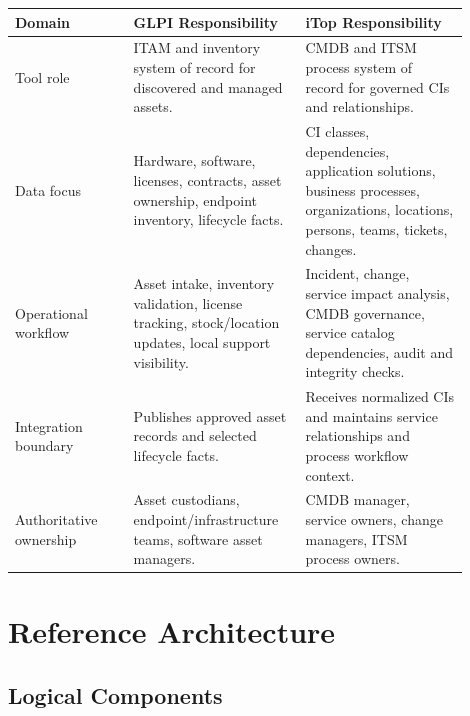 \documentclass[11pt]{article}
\begin{document}
\begin{longtable}{p{0.24\linewidth}p{0.33\linewidth}p{0.33\linewidth}}
\toprule
\rowcolor{LightBlue}\textbf{Domain} & \textbf{GLPI Responsibility} & \textbf{iTop Responsibility} \\
\midrule
Tool role & ITAM and inventory system of record for discovered and managed assets. & CMDB and ITSM process system of record for governed CIs and relationships. \\
\addlinespace
Data focus & Hardware, software, licenses, contracts, asset ownership, endpoint inventory, lifecycle facts. & CI classes, dependencies, application solutions, business processes, organizations, locations, persons, teams, tickets, changes. \\
\addlinespace
Operational workflow & Asset intake, inventory validation, license tracking, stock/location updates, local support visibility. & Incident, change, service impact analysis, CMDB governance, service catalog dependencies, audit and integrity checks. \\
\addlinespace
Integration boundary & Publishes approved asset records and selected lifecycle facts. & Receives normalized CIs and maintains service relationships and process workflow context. \\
\addlinespace
Authoritative ownership & Asset custodians, endpoint/infrastructure teams, software asset managers. & CMDB manager, service owners, change managers, ITSM process owners. \\
\bottomrule
\end{longtable}

\section{Reference Architecture}

\subsection{Logical Components}
\end{document}
